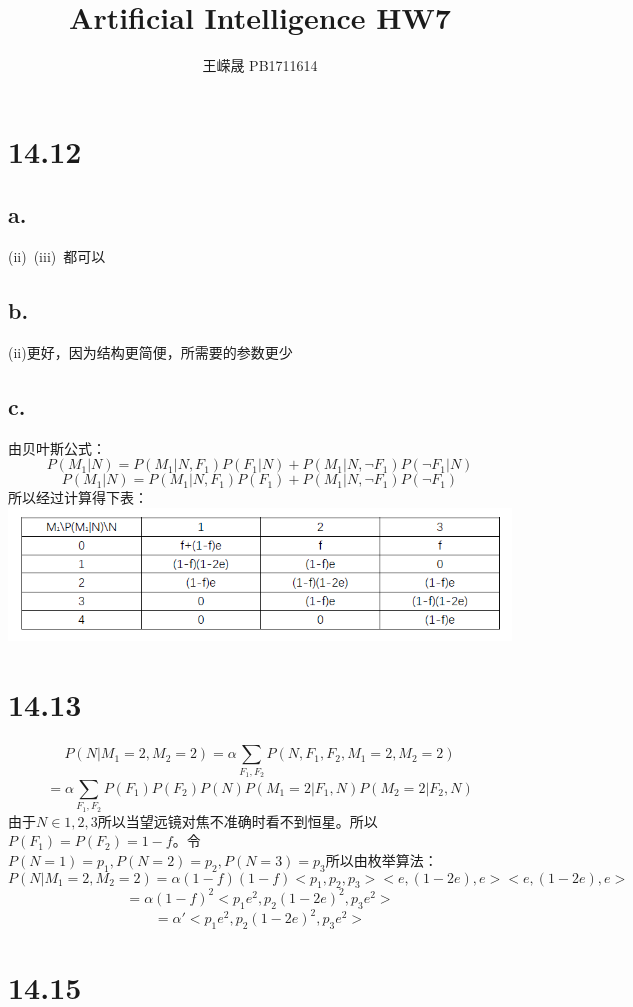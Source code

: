 \documentclass{article}
\title{Artificial Intelligence HW7}
\author{王嵘晟 \quad PB1711614}
\date{}
\begin{document}
	\maketitle
	\section*{14.12}
	\subsection*{a.}
	(ii)\ (iii)\ 都可以
	\subsection*{b.}
	(ii)更好，因为结构更简便，所需要的参数更少
	\subsection*{c.}
	由贝叶斯公式：\\
	$$P(M_{1}|N)=P(M_{1}|N,F_{1})P(F_{1}|N)+P(M_{1}|N,\neg F_{1})P(\neg F_{1}|N)$$
	$$P(M_{1}|N)=P(M_{1}|N,F_{1})P(F_{1})+P(M_{1}|N,\neg F_{1})P(\neg F_{1})$$
	所以经过计算得下表： \\
	\includegraphics*[scale = 0.55]{1.png}
	\section*{14.13}
	$$P(N|M_{1}=2,M_{2}=2)=\alpha \sum_{F_{1},F_{2}}^{ }P(N,F_{1},F_{2},M_{1}=2,M_{2}=2) $$
	$$=\alpha \sum_{F_{1},F_{2}}^{ }P(F_{1})P(F_{2})P(N)P(M_{1}=2|F_{1},N)P(M_{2}=2|F_{2},N) $$
	由于$N\in {1,2,3}$所以当望远镜对焦不准确时看不到恒星。所以$P(F_{1})=P(F_{2})=1-f$。令$P(N=1)=p_{1},P(N=2)=p_{2},P(N=3)=p_{3}$所以由枚举算法：
	$$P(N|M_{1}=2,M_{2}=2)=\alpha (1-f)(1-f)<p_{1},p_{2},p_{3}><e,(1-2e),e><e,(1-2e),e>$$
	$$=\alpha(1-f)^{2}<p_{1}e^{2},p_{2}(1-2e)^{2},p_{3}e^{2}>$$
	$$=\alpha '<p_{1}e^{2},p_{2}(1-2e)^{2},p_{3}e^{2}>$$
	\section*{14.15}
\end{document}
